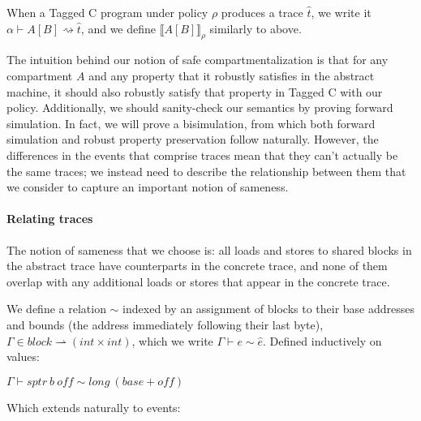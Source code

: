 \documentclass{article}
\begin{document}
When a Tagged C program under policy \(\rho\) produces a trace \(\hat{t}\), we write it
\(\alpha \vdash A[B] \rightsquigarrow \hat{t}\), and we define \(\llbracket A[B] \rrbracket_\rho\)
similarly to above.

The intuition behind our notion of safe compartmentalization is that for any compartment
\(A\) and any property that it robustly satisfies in the abstract machine, it should also
robustly satisfy that property in Tagged C with our policy. Additionally, we should sanity-check
our semantics by proving forward simulation. In fact, we will prove a bisimulation, from which
both forward simulation and robust property preservation follow naturally. However, the differences
in the events that comprise traces mean that they can't actually be the same traces; we instead
need to describe the relationship between them that we consider to capture an important notion
of sameness.

\paragraph{Relating traces}

The notion of sameness that we choose is: all loads and stores to shared blocks in the abstract
trace have counterparts in the concrete trace, and none of them overlap with any additional
loads or stores that appear in the concrete trace.

We define a relation \(\sim\) indexed by an assignment of blocks to their base addresses and bounds
(the address immediately following their last byte),
\(\Gamma \in \mathit{block} \rightharpoonup (\mathit{int} \times \mathit{int})\), which we write
\(\Gamma \vdash e \sim \hat{e}\). Defined inductively on values:

\begin{minipage}{0.38\textwidth}
           {\(\Gamma \vdash \mathit{sptr} ~ b ~ \mathit{off} \sim
             \mathit{long} ~ (\mathit{base}+\mathit{off})\)}
\end{minipage}
\begin{minipage}{0.38\textwidth}
\end{minipage}
\begin{minipage}{0.23\textwidth}
\end{minipage}

Which extends naturally to events:
\end{document}

